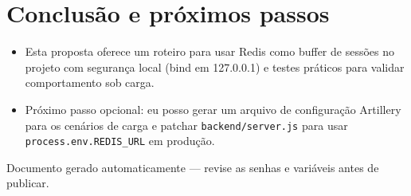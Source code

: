 \documentclass[a4paper,11pt]{article}
\begin{document}
\section*{Conclusão e próximos passos}
\begin{itemize}
  \item Esta proposta oferece um roteiro para usar Redis como buffer de sessões no projeto com segurança local (bind em 127.0.0.1) e testes práticos para validar comportamento sob carga.
  \item Próximo passo opcional: eu posso gerar um arquivo de configuração Artillery para os cenários de carga e patchar \texttt{backend/server.js} para usar \texttt{process.env.REDIS_URL} em produção.
\end{itemize}

\vfill
\noindent Documento gerado automaticamente — revise as senhas e variáveis antes de publicar.
\end{document}
